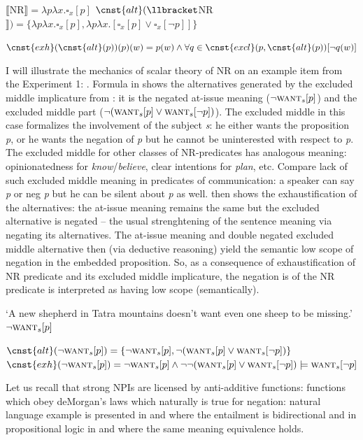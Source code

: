 \documentclass[output=paper,
]{langscibook}
\begin{document}
\ea \ea \label{ex-25-a} $\llbracket$NR$\rrbracket = \lambda p\lambda x.\square_x[p]$
\ex \label{ex-25-b} $\cnst{alt}(\llbracket$NR$\rrbracket)=\{\lambda p\lambda x.\square_x[p],\lambda p\lambda x.[\square_x[p] \vee \square_x[\neg p]]\}$
\z
\z

\ea \label{ex-26} $\cnst{exh}(\cnst{alt}(p))(p)(w) = p(w) \wedge \forall q \in \cnst{excl}(p,\cnst{alt}(p))[\neg q(w)]$
\z

\noindent I will illustrate the mechanics of scalar theory of NR on an example item from the Experiment 1: . Formula in  shows the alternatives generated by the excluded middle implicature from : it is the negated at-issue meaning ($\neg \textsc{want}_s[p]$) and the excluded middle part ($\neg(\textsc{want}_s[p] \vee \textsc{want}_s[\neg p])$). The excluded middle in this case formalizes the involvement of the subject \textit{s}: he either wants the proposition \textit{p}, or he wants the negation of \textit{p} but he cannot be uninterested with respect to \textit{p}. The excluded middle for other classes of NR-predicates has analogous meaning: opinionatedness for \textit{know}/\textit{believe}, clear intentions for \textit{plan}, etc. Compare lack of such excluded middle meaning in predicates of communication: a speaker can say \textit{p} or neg \textit{p} but he can be silent about \textit{p} as well.  then shows the exhaustification of the alternatives: the at-issue meaning remains the same but the excluded alternative is negated -- the usual strenghtening of the sentence meaning via negating its alternatives. The at-issue meaning and double negated excluded middle alternative then (via deductive reasoning) yield the semantic low scope of negation in the embedded proposition. So, as a consequence of exhaustification of NR predicate and its excluded middle implicature, the negation is of the NR predicate is interpreted as having low scope (semantically).

\ea\label{ex-27} `A new shepherd in Tatra mountains doesn't want even one sheep to be missing.'\\ $\neg \textsc{want}_s[p]$
\z

\ea \ea \label{ex-28-a}$\cnst{alt}(\neg \textsc{want}_s[p])=\{\neg \textsc{want}_s[p], \neg(\textsc{want}_s[p] \vee \textsc{want}_s[\neg p])\}$
\ex \label{ex-28-b}$\cnst{exh}(\neg \textsc{want}_s[p])=\neg \textsc{want}_s[p] \wedge \neg \neg(\textsc{want}_s[p] \vee \textsc{want}_s[\neg p]) \models \textsc{want}_s[\neg p]$
\z
\z

\noindent Let us recall that strong NPIs are licensed by anti-additive functions: functions which obey deMorgan's laws which naturally is true for negation: natural language example is presented in  and  where the entailment is bidirectional and in propositional logic in  and  where the same meaning equivalence holds.
\end{document}

